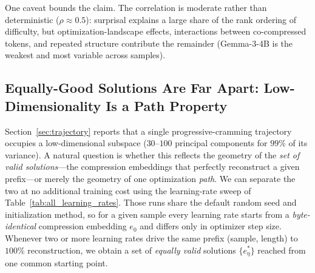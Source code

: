 One caveat bounds the claim. The correlation is moderate rather than deterministic ($\rho \approx 0.5$):
surprisal explains a large share of the rank ordering of difficulty, but optimization-landscape
effects, interactions between co-compressed tokens, and repeated structure contribute the remainder
(Gemma-3-4B is the weakest and most variable across samples).

\begin{table}[t]
    \centering
    \caption{Per-token surprisal predicts the marginal number of optimization steps progressive
    cramming spends to absorb a token. For each base model we align, over all perfectly converged
    single-token stages, the marginal step cost $\Delta\text{steps}(n)$ with the frozen base model's
    next-token surprisal $s(n)=-\log_2 p(x_n\mid x_{<n})$, and report their Spearman rank correlation.
    ``$N$'' is the number of aligned token-level pairs (pooled over $50$ PG19 samples). ``Spearman
    $\rho$ [95\% CI]'' is the pooled correlation with a cluster-bootstrap interval that resamples
    whole samples. ``Partial $\rho \mid n$'' controls for prefix position, isolating the surprisal
    effect from any shared trend with sequence depth. ``Per-sample $\bar\rho$'' is the mean
    $\pm$ standard deviation of the within-sample correlations, and ``\% $\rho{>}0$'' the fraction of
    samples with a positive correlation. The relationship is positive, reliable, and not a
    position artifact for every family, tokenizer, and scale tested.}
    \label{tab:surprisal_steps_correlation}
    \begin{small}
    
\end{small}
\vskip -0.1in
\end{table}


\subsection{Equally-Good Solutions Are Far Apart: Low-Dimensionality Is a Path Property}
\label{app:solution_diversity}

Section~\ref{sec:trajectory} reports that a single progressive-cramming trajectory occupies a
low-dimensional subspace ($30$--$100$ principal components for $99\%$ of its variance). A natural
question is whether this reflects the geometry of the \emph{set of valid solutions}---the compression
embeddings that perfectly reconstruct a given prefix---or merely the geometry of one optimization
\emph{path}. We can separate the two at no additional training cost using the learning-rate sweep of
Table~\ref{tab:all_learning_rates}. Those runs share the default random seed and initialization
method, so for a given sample every learning rate starts from a \emph{byte-identical} compression
embedding $e_0$ and differs only in optimizer step size. Whenever two or more learning rates drive the
same prefix (sample, length) to $100\%$ reconstruction, we obtain a set of \emph{equally valid}
solutions $\{e^*_{\eta}\}$ reached from one common starting point.

